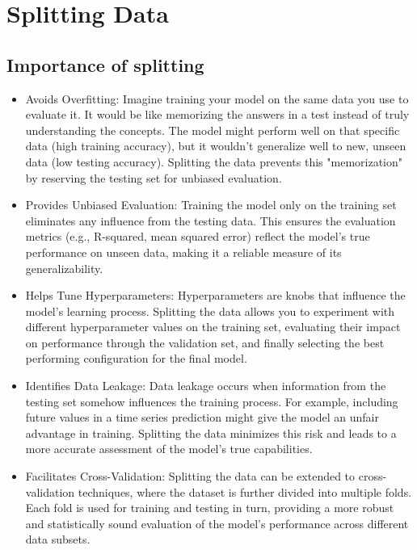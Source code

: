 \section{Splitting Data}

\subsection{Importance of splitting}

\begin{itemize}
\item Avoids Overfitting: Imagine training your model on the same data you use to evaluate it. It would be like memorizing the answers in a test instead of truly understanding the concepts. The model might perform well on that specific data (high training accuracy), but it wouldn't generalize well to new, unseen data (low testing accuracy). Splitting the data prevents this "memorization" by reserving the testing set for unbiased evaluation.
\item Provides Unbiased Evaluation: Training the model only on the training set eliminates any influence from the testing data. This ensures the evaluation metrics (e.g., R-squared, mean squared error) reflect the model's true performance on unseen data, making it a reliable measure of its generalizability.
\item Helps Tune Hyperparameters: Hyperparameters are knobs that influence the model's learning process. Splitting the data allows you to experiment with different hyperparameter values on the training set, evaluating their impact on performance through the validation set, and finally selecting the best performing configuration for the final model.
\item Identifies Data Leakage: Data leakage occurs when information from the testing set somehow influences the training process. For example, including future values in a time series prediction might give the model an unfair advantage in training. Splitting the data minimizes this risk and leads to a more accurate assessment of the model's true capabilities.
\item Facilitates Cross-Validation: Splitting the data can be extended to cross-validation techniques, where the dataset is further divided into multiple folds. Each fold is used for training and testing in turn, providing a more robust and statistically sound evaluation of the model's performance across different data subsets.
\end{itemize}
